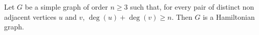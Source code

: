 \documentclass[12pt]{article}
\begin{document}
Let $G$ be a simple graph of order $n\ge 3$ such that, for every pair of distinct non adjacent vertices $u$ and $v$, $\deg(u)+\deg(v)\ge n$.
Then $G$ is a Hamiltonian graph.
\end{document}

